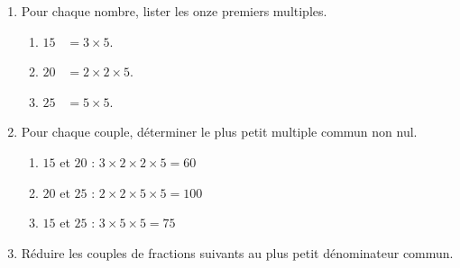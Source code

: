 \begin{corrige}
    \begin{enumerate}
        \item Pour chaque nombre, lister les onze premiers multiples.
        
            \begin{enumerate}
                \item $15$ ~{\red $= 3\times 5$.}
                \item $20$ ~{\red $= 2\times 2\times 5$.}
                \item $25$ ~{\red $= 5\times 5$.}
            \end{enumerate}  
        \setcounter{enumi}{1}
        \item Pour chaque couple, déterminer le plus petit multiple commun non nul.

            \begin{enumerate}
                \item $15$ et $20$ {\red : $3\times 2\times2 \times5 = 60$}
                \item $20$ et $25$ {\red : $2\times 2\times 5\times 5 = 100$}
                \item $15$ et $25$ {\red : $3\times 5\times 5 = 75$}
            \end{enumerate}           
        \setcounter{enumi}{2}
        \item Réduire les couples de fractions suivants au plus petit dénominateur commun.
        
            \begin{enumerate}
            \end{enumerate}
    \end{enumerate}
\end{corrige}

